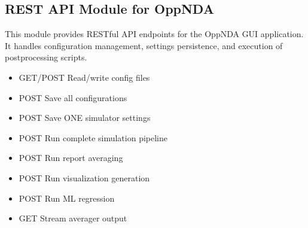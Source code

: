 \documentclass[a4paper,11pt,english,openany,oneside]{sphinxmanual}
\begin{document}
\subsection{REST API Module for OppNDA}
\label{\detokenize{modules/api:rest-api-module-for-oppnda}}\label{\detokenize{modules/api:module-app.api}}
\sphinxAtStartPar
This module provides RESTful API endpoints for the OppNDA GUI application.
It handles configuration management, settings persistence, and execution
of post\sphinxhyphen{}processing scripts.
\begin{description}
\begin{description}
\begin{itemize}
\item {} 
\sphinxAtStartPar
GET/POST  \sphinxhyphen{} Read/write config files

\item {} 
\sphinxAtStartPar
POST  \sphinxhyphen{} Save all configurations

\item {} 
\sphinxAtStartPar
POST  \sphinxhyphen{} Save ONE simulator settings

\end{itemize}

\begin{itemize}
\item {} 
\sphinxAtStartPar
POST  \sphinxhyphen{} Run complete simulation pipeline

\item {} 
\sphinxAtStartPar
POST  \sphinxhyphen{} Run report averaging

\item {} 
\sphinxAtStartPar
POST  \sphinxhyphen{} Run visualization generation

\item {} 
\sphinxAtStartPar
POST  \sphinxhyphen{} Run ML regression

\end{itemize}

\begin{itemize}
\item {} 
\sphinxAtStartPar
GET  \sphinxhyphen{} Stream averager output


\end{itemize}
\end{description}
\end{description}
\end{document}
